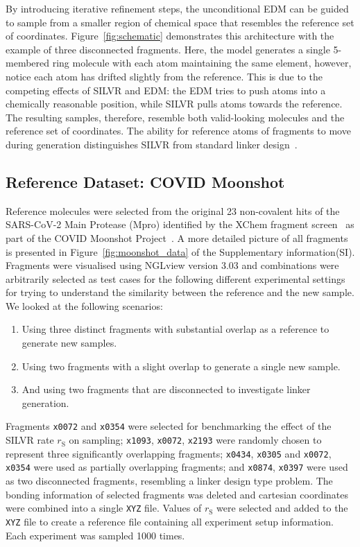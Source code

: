 \documentclass[journal=jacsat,manuscript=article]{achemso}
\begin{document}
By introducing iterative refinement steps, the unconditional EDM can be guided to sample from a smaller region of chemical space that resembles the reference set of coordinates. Figure~\ref{fig:schematic} demonstrates this architecture with the example of three disconnected fragments. Here, the model generates a single 5-membered ring molecule with each atom maintaining the same element, however, notice each atom has drifted slightly from the reference. This is due to the competing effects of SILVR and EDM: the EDM tries to push atoms into a chemically reasonable position, while SILVR pulls atoms towards the reference. The resulting samples, therefore, resemble both valid-looking molecules and the reference set of coordinates. The ability for reference atoms of fragments to move during generation distinguishes SILVR from standard linker design~\cite{guo2023linkinvent, igashov2022equivariant}.

\subsection{Reference Dataset: COVID Moonshot}
Reference molecules were selected from the original 23 non-covalent hits of the SARS-CoV-2 Main Protease (Mpro) identified by the XChem fragment screen~\cite{douangamath2020crystallographic} as part of the COVID Moonshot Project~\cite{consortium2023open, consortium2021open}. A more detailed picture of all fragments is presented in Figure~\ref{fig:moonshot_data} of the Supplementary information(SI). Fragments were visualised using NGLview version 3.03 and combinations were arbitrarily selected as test cases for the following different experimental settings for trying to understand the similarity between the reference and the new sample. We looked at the following scenarios:
\begin{enumerate}
    \item Using three distinct fragments with substantial overlap as a reference to generate new samples.
    \item Using two fragments with a slight overlap to generate a single new sample.
    \item And using two fragments that are disconnected to investigate linker generation.
\end{enumerate}
Fragments \texttt{x0072} and \texttt{x0354} were selected for benchmarking the effect of the SILVR rate $r_{\mathrm{S}}$ on sampling; \texttt{x1093}, \texttt{x0072}, \texttt{x2193} were randomly chosen to represent three significantly overlapping fragments; \texttt{x0434}, \texttt{x0305} and \texttt{x0072}, \texttt{x0354} were used as partially overlapping fragments; and \texttt{x0874}, \texttt{x0397} were used as two disconnected fragments, resembling a linker design type problem. The bonding information of selected fragments was deleted and cartesian coordinates were combined into a single \texttt{XYZ} file. Values of $r_{\mathrm{S}}$ were selected and added to the \texttt{XYZ} file to create a reference file containing all experiment setup information. Each experiment was sampled 1000 times. 
\end{document}
